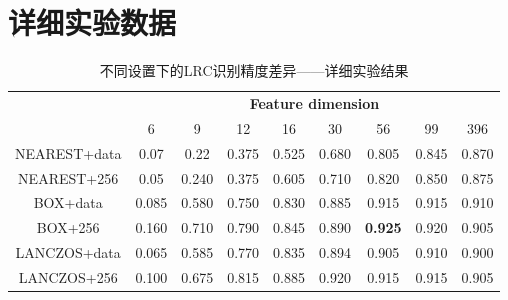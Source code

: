 \section{详细实验数据}
\begin{table}[htbp]
    \centering
    \caption{不同设置下的LRC识别精度差异——详细实验结果}\label{tab-detailed_results}
    \begin{tabular}{ccccccccc}
        \toprule
        & \multicolumn{8}{c}{\textbf{Feature dimension}} \\
        \cmidrule{2-9}
        & 6 & 9 & 12 & 16 & 30 & 56 & 99 & 396 \\
        \midrule
        NEAREST+data & 0.07 & 0.22 & 0.375 & 0.525 & 0.680 & 0.805 & 0.845 & 0.870 \\
        \midrule
        NEAREST+256 & 0.05 & 0.240 & 0.375 & 0.605 & 0.710 & 0.820 & 0.850 & 0.875 \\
        \midrule
        BOX+data & 0.085 & 0.580 & 0.750 & 0.830 & 0.885 & 0.915 & 0.915 & 0.910 \\
        \midrule
        BOX+256 & 0.160 & 0.710 & 0.790 & 0.845 & 0.890 & \textbf{0.925} & 0.920 & 0.905 \\
        \midrule
        LANCZOS+data & 0.065 & 0.585 & 0.770 & 0.835 & 0.894 & 0.905 & 0.910 & 0.900 \\
        \midrule
        LANCZOS+256 & 0.100 & 0.675 & 0.815 & 0.885 & 0.920 & 0.915 & 0.915 & 0.905 \\
        \bottomrule
    \end{tabular}
\end{table}

